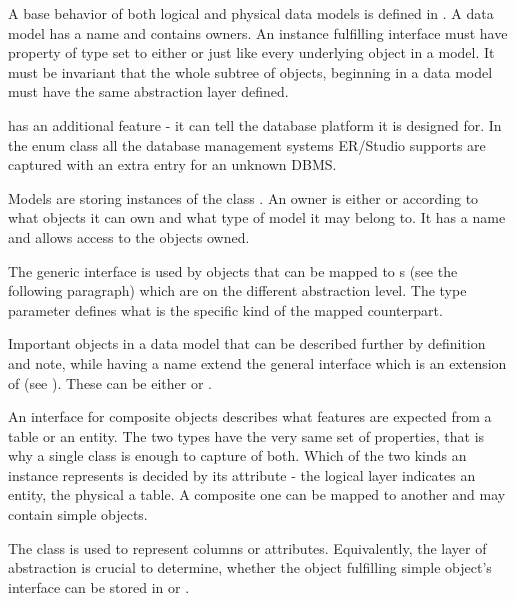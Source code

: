 A base behavior of both logical and physical data models is defined in .
A data model has a name and contains owners. An instance fulfilling  interface must have property of type  set to either  or  just like every underlying object in a model.
It must be invariant that the whole subtree of objects, beginning in a data model must have the same abstraction layer defined.

 has an additional feature - it can tell the database platform it is designed for. 
In the enum class  all the database management systems ER/Studio supports are captured with an extra entry for an unknown DBMS.

Models are storing instances of the class . An owner is either  or  according to what objects it can own and what type of model it may belong to. 
It has a name and allows access to the objects owned.

The generic interface  is used by objects that can be mapped to s (see the following paragraph) which are on the different abstraction level. The type parameter defines what is the specific kind of the mapped counterpart.

Important objects in a data model that can be described further by definition and note, while having a name extend the general  interface which is an extension of  (see ). 
These can be either  or .

An interface for composite objects describes what features are expected from a table or an entity.
The two types have the very same set of properties, that is why a single class is enough to capture of both. 
Which of the two kinds an instance represents is decided by its  attribute - the logical layer indicates an entity, the physical a table.
A composite one can be mapped to another  and may contain simple objects.

The  class is used to represent columns or attributes. Equivalently, the layer of abstraction is crucial to determine, whether the object fulfilling simple object's interface can be stored in  or .

